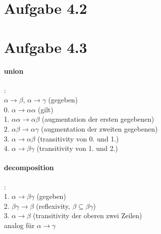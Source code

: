 \documentclass{article}
\begin{document}
		\pagebreak
	
	\section*{Aufgabe 4.2}
		
		
		
	\section*{Aufgabe 4.3}
		\paragraph*{union}:\\
			$\alpha \rightarrow \beta$,	$\alpha \rightarrow \gamma$ \hspace*{25mm} (gegeben)\\
			0. $\alpha \rightarrow \alpha \alpha$ \hspace*{31mm} (gilt)\\
			1. $\alpha \alpha \rightarrow \alpha \beta$ \hspace*{29mm} (augmentation der ersten gegebenen)\\
			2. $\alpha \beta \rightarrow \alpha \gamma$ \hspace*{29mm} (augmentation der zweiten gegebenen)\\
			3. $\alpha \rightarrow \alpha \beta$ \hspace*{31mm} (transitivity von 0. und 1.)\\
			4. $\alpha \rightarrow \beta \gamma$ \hspace*{31mm} (transitivity von 1. und 2.)
			
		\paragraph*{decomposition}:\\
			1. $\alpha \rightarrow \beta \gamma$ \hspace*{31mm} (gegeben)\\
			2. $\beta \gamma \rightarrow \beta$ \hspace*{31mm} (reflexivity, $\beta \subseteq \beta\gamma$)\\
			3. $\alpha \rightarrow \beta$ \hspace*{33mm} (transitivity der oberen zwei Zeilen)\\
			analog für $\alpha \rightarrow \gamma$
		
\end{document}
